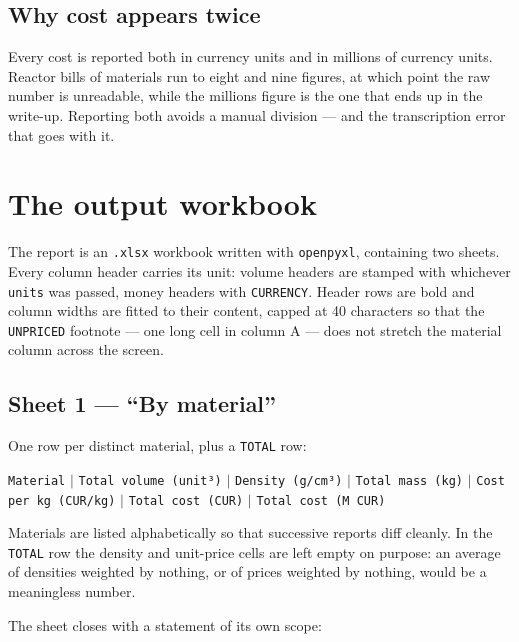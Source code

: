\documentclass[9pt,a4paper]{extarticle}
\newcommand{\code}[1]{\texttt{\small #1}}
\begin{document}
\subsection{Why cost appears twice}

Every cost is reported both in currency units and in millions of currency units.
Reactor bills of materials run to eight and nine figures, at which point the raw
number is unreadable, while the millions figure is the one that ends up in the
write-up. Reporting both avoids a manual division --- and the transcription
error that goes with it.

\section{The output workbook}

The report is an \code{.xlsx} workbook written with \code{openpyxl}, containing
two sheets. Every column header carries its unit: volume headers are stamped
with whichever \code{units} was passed, money headers with \code{CURRENCY}.
Header rows are bold and column widths are fitted to their content, capped at 40
characters so that the \code{UNPRICED} footnote --- one long cell in column A ---
does not stretch the material column across the screen.

\subsection{Sheet 1 --- ``By material''}

One row per distinct material, plus a \code{TOTAL} row:

\begin{center}\footnotesize
\code{Material} $\mid$ \code{Total volume (unit³)} $\mid$ \code{Density (g/cm³)}
$\mid$ \code{Total mass (kg)} $\mid$ \code{Cost per kg (CUR/kg)} $\mid$
\code{Total cost (CUR)} $\mid$ \code{Total cost (M CUR)}
\end{center}

Materials are listed alphabetically so that successive reports diff cleanly. In
the \code{TOTAL} row the density and unit-price cells are left empty on purpose:
an average of densities weighted by nothing, or of prices weighted by nothing,
would be a meaningless number.

The sheet closes with a statement of its own scope:
\end{document}
